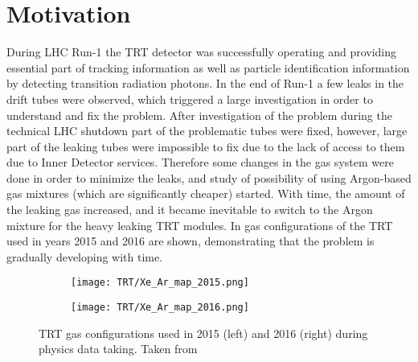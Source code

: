 \section{Motivation}
\label{sec:TRT_intro}

During LHC Run-1 the TRT detector was successfully operating and providing essential part of tracking information 
as well as particle identification information by detecting transition radiation photons. In the end of Run-1 
a few leaks in the drift tubes were observed, which triggered a large investigation in order to understand and fix the problem. 
After investigation of the problem during the technical LHC shutdown part of the problematic tubes were fixed, however, large part of the leaking tubes were impossible to fix due to the lack of access to them due to Inner Detector services.
Therefore some changes in the gas system were done in order to minimize the leaks, 
and study of possibility of using Argon-based gas mixtures (which are significantly cheaper) started. 
With time, the amount of the leaking gas increased, and it became inevitable to switch to the Argon mixture 
for the heavy leaking TRT modules. In  gas configurations of the TRT used in years 2015 and 2016 are shown, demonstrating that the problem is gradually developing with time.

\begin{figure}
\centering
\begin{subfigure}{.5\textwidth}
  \centering
  \texttt{[image: TRT/Xe\_Ar\_map\_2015.png]}
  \label{fig:sub1}
\end{subfigure}%
\begin{subfigure}{.5\textwidth}
  \centering
  \texttt{[image: TRT/Xe\_Ar\_map\_2016.png]}
  \label{fig:sub2}
\end{subfigure}
\caption{TRT gas configurations used in 2015 (left) and 2016 (right) during physics data taking. Taken from~\cite{trt_public_plots_2016}}
\label{fig:mixed_condition_2015_2016}
\end{figure}

